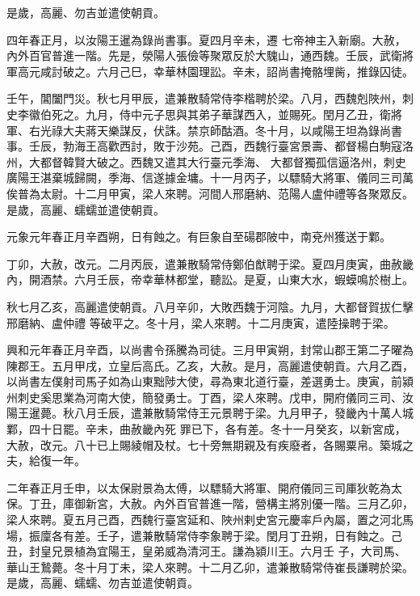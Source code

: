 \begin{pinyinscope}
 是歲，高麗、勿吉並遣使朝貢。



 四年春正月，以汝陽王暹為錄尚書事。夏四月辛未，遷
 七帝神主入新廟。大赦，內外百官普進一階。先是，滎陽人張儉等聚眾反於大騩山，通西魏。壬辰，武衛將軍高元咸討破之。六月己巳，幸華林園理訟。辛未，詔尚書掩骼埋胔，推錄囚徒。



 壬午，閶闔門災。秋七月甲辰，遣兼散騎常侍李楷聘於梁。八月，西魏剋陜州，刺史李徽伯死之。九月，侍中元子思與其弟子華謀西入，並賜死。閏月乙丑，衛將軍、右光祿大夫蔣天樂謀反，伏誅。禁京師酤酒。冬十月，以咸陽王坦為錄尚書事。壬辰，勃海王高歡西討，敗于沙苑。己酉，西魏行臺宮景壽、都督楊白駒寇洛州，大都督韓賢大破之。西魏又遣其大行臺元季海、
 大都督獨孤信逼洛州，刺史廣陽王湛棄城歸闕，季海、信遂據金墉。十一月丙子，以驃騎大將軍、儀同三司萬俟普為太尉。十二月甲寅，梁人來聘。河間人邢磨納、范陽人盧仲禮等各聚眾反。是歲，高麗、蠕蠕並遣使朝貢。



 元象元年春正月辛酉朔，日有蝕之。有巨象自至碭郡陂中，南兗州獲送于鄴。



 丁卯，大赦，改元。二月丙辰，遣兼散騎常侍鄭伯猷聘于梁。夏四月庚寅，曲赦畿內，開酒禁。六月壬辰，帝幸華林都堂，聽訟。是夏，山東大水，蝦蟆鳴於樹上。



 秋七月乙亥，高麗遣使朝貢。八月辛卯，大敗西魏于河陰。九月，大都督賀拔仁擊邢磨納、盧仲禮
 等破平之。冬十月，梁人來聘。十二月庚寅，遣陸操聘于梁。



 興和元年春正月辛酉，以尚書令孫騰為司徒。三月甲寅朔，封常山郡王第二子曜為陳郡王。五月甲戌，立皇后高氏。乙亥，大赦。是月，高麗遣使朝貢。六月乙酉，以尚書左僕射司馬子如為山東黜陟大使，尋為東北道行臺，差選勇士。庚寅，前潁州刺史奚思業為河南大使，簡發勇士。丁酉，梁人來聘。戊申，開府儀同三司、汝陽王暹薨。秋八月壬辰，遣兼散騎常侍王元景聘于梁。九月甲子，發畿內十萬人城鄴，四十日罷。辛未，曲赦畿內死
 罪已下，各有差。冬十一月癸亥，以新宮成，大赦，改元。八十已上賜綾帽及杖。七十旁無期親及有疾廢者，各賜粟帛。築城之夫，給復一年。



 二年春正月壬申，以太保尉景為太傅，以驃騎大將軍、開府儀同三司厙狄乾為太保。丁丑，庫御新宮，大赦。內外百官普進一階，營構主將別優一階。三月乙卯，梁人來聘。夏五月己酉，西魏行臺宮延和、陜州剌史宮元慶率戶內屬，置之河北馬場，振廩各有差。壬子，遣兼散騎常侍李象聘于梁。閏月丁丑朔，日有蝕之。己丑，封皇兄景植為宜陽王，皇弟威為清河王。謙為潁川王。六月壬
 子，大司馬、華山王鷙薨。冬十月丁未，梁人來聘。十二月乙卯，遣兼散騎常侍崔長謙聘於梁。是歲，高麗、蠕蠕、勿吉並遣使朝貢。




\end{pinyinscope}
